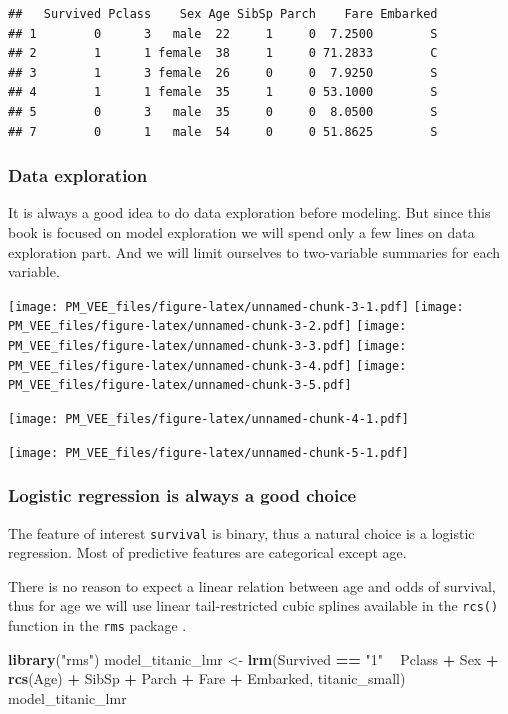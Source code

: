 \documentclass[]{krantz}
\newenvironment{Shaded}{\begin{snugshade}}{\end{snugshade}}
\newcommand{\KeywordTok}[1]{\textcolor[rgb]{0.13,0.29,0.53}{\textbf{#1}}}
\newcommand{\NormalTok}[1]{#1}
\newcommand{\OperatorTok}[1]{\textcolor[rgb]{0.81,0.36,0.00}{\textbf{#1}}}
\newcommand{\StringTok}[1]{\textcolor[rgb]{0.31,0.60,0.02}{#1}}
\theoremstyle{definition}
\theoremstyle{definition}
\theoremstyle{definition}
\theoremstyle{remark}
\begin{document}
\begin{verbatim}
##   Survived Pclass    Sex Age SibSp Parch    Fare Embarked
## 1        0      3   male  22     1     0  7.2500        S
## 2        1      1 female  38     1     0 71.2833        C
## 3        1      3 female  26     0     0  7.9250        S
## 4        1      1 female  35     1     0 53.1000        S
## 5        0      3   male  35     0     0  8.0500        S
## 7        0      1   male  54     0     0 51.8625        S
\end{verbatim}

\hypertarget{data-exploration}{%
\subsubsection{Data exploration}\label{data-exploration}}

It is always a good idea to do data exploration before modeling. But
since this book is focused on model exploration we will spend only a few
lines on data exploration part. And we will limit ourselves to
two-variable summaries for each variable.

\texttt{[image: PM\_VEE\_files/figure-latex/unnamed-chunk-3-1.pdf]}
\texttt{[image: PM\_VEE\_files/figure-latex/unnamed-chunk-3-2.pdf]}
\texttt{[image: PM\_VEE\_files/figure-latex/unnamed-chunk-3-3.pdf]}
\texttt{[image: PM\_VEE\_files/figure-latex/unnamed-chunk-3-4.pdf]}
\texttt{[image: PM\_VEE\_files/figure-latex/unnamed-chunk-3-5.pdf]}

\texttt{[image: PM\_VEE\_files/figure-latex/unnamed-chunk-4-1.pdf]}

\texttt{[image: PM\_VEE\_files/figure-latex/unnamed-chunk-5-1.pdf]}

\hypertarget{model_titanic_lmr}{%
\subsubsection{Logistic regression is always a good
choice}\label{model_titanic_lmr}}

The feature of interest \texttt{survival} is binary, thus a natural
choice is a logistic regression. Most of predictive features are
categorical except age.

There is no reason to expect a linear relation between age and odds of
survival, thus for age we will use linear tail-restricted cubic splines
available in the \texttt{rcs()} function in the \texttt{rms} package
\citep{rms}.

\begin{Shaded}
\begin{Highlighting}[]
\KeywordTok{library}\NormalTok{(}\StringTok{"rms"}\NormalTok{)}
\NormalTok{model_titanic_lmr <-}\StringTok{ }\KeywordTok{lrm}\NormalTok{(Survived }\OperatorTok{==}\StringTok{ "1"} \OperatorTok{~}\StringTok{ }\NormalTok{Pclass }\OperatorTok{+}\StringTok{ }\NormalTok{Sex }\OperatorTok{+}\StringTok{ }\KeywordTok{rcs}\NormalTok{(Age) }\OperatorTok{+}\StringTok{ }\NormalTok{SibSp }\OperatorTok{+}
\StringTok{                   }\NormalTok{Parch }\OperatorTok{+}\StringTok{ }\NormalTok{Fare }\OperatorTok{+}\StringTok{ }\NormalTok{Embarked, titanic_small)}
\NormalTok{model_titanic_lmr}
\end{Highlighting}
\end{Shaded}
\end{document}
